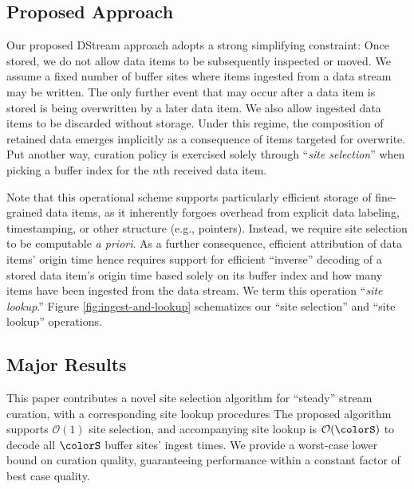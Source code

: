 \subsection{Proposed Approach}


Our proposed DStream approach adopts a strong simplifying constraint: Once stored, we do not allow data items to be subsequently inspected or moved.
We assume a fixed number of buffer sites where items ingested from a data stream may be written.
The only further event that may occur after a data item is stored is being overwritten by a later data item.
We also allow ingested data items to be discarded without storage.
Under this regime, the composition of retained data emerges implicitly as a consequence of items targeted for overwrite.
Put another way, curation policy is exercised solely through ``\textit{site selection}'' when picking a buffer index for the $n$th received data item.

Note that this operational scheme supports particularly efficient storage of fine-grained data items, as it inherently forgoes overhead from explicit data labeling, timestamping, or other structure (e.g., pointers).
Instead, we require site selection to be computable \textit{a priori}.
As a further consequence, efficient attribution of data items' origin time hence requires support for efficient ``inverse'' decoding of a stored data item's origin time based solely on its buffer index and how many items have been ingested from the data stream.
We term this operation ``\textit{site lookup}.''
Figure \ref{fig:ingest-and-lookup} schematizes our ``site selection'' and ``site lookup'' operations.



\subsection{Major Results}

This paper contributes a novel site selection algorithm for ``steady'' stream curation, with a corresponding site lookup procedures
The proposed algorithm supports $\mathcal{O}(1)$ site selection, and accompanying site lookup is $\mathcal{O}(\colorS)$ to decode all $\colorS$ buffer sites' ingest times.
We provide a worst-case lower bound on curation quality, guaranteeing performance within a constant factor of best case quality.

